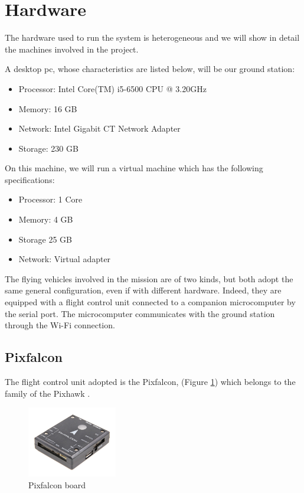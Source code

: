 \section{Hardware}

The hardware used to run the system is heterogeneous and we will show in detail
the machines involved in the project.

A desktop pc, whose characteristics are listed below, will be our ground station:
\begin{itemize}
  \item Processor: Intel Core(TM) i5-6500 CPU @ 3.20GHz
  \item Memory: 16 GB
  \item Network: Intel Gigabit CT Network Adapter
  \item Storage: 230 GB
\end{itemize}

On this machine, we will run a virtual machine which has the following specifications:
\begin{itemize}
  \item Processor: 1 Core
  \item Memory: 4 GB
  \item Storage 25 GB
  \item Network: Virtual adapter
\end{itemize}

The flying vehicles involved in the mission are of two kinds, but both adopt the
same general configuration, even if with different hardware. Indeed, they are equipped
with a flight control unit connected to a companion microcomputer by the serial port.
The microcomputer communicates with the ground station through the Wi-Fi connection.

\subsection{Pixfalcon}
The flight control unit adopted is the Pixfalcon, (Figure \ref{fig:hardware_pixfalcon})
which belongs to the family of the Pixhawk \cite{pixhawk}.

\begin{figure}
\centering
\includegraphics[width=0.35\textwidth]{chapters/chapter-02/figures/hardware_pixfalcon.png}
\caption{Pixfalcon board}
\label{fig:hardware_pixfalcon}
\end{figure}

